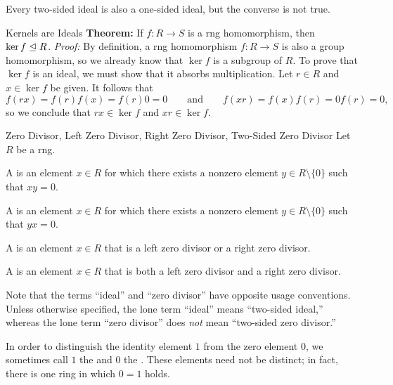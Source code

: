 
Every two-sided ideal is also a one-sided ideal, but the converse is not true.

\begin{thmbox}{Kernels are Ideals}
	\textbf{Theorem:} If $f: R \to S$ is a rng homomorphism, then $\ker f \trianglelefteq R$.
\tcblower
	\textit{Proof:} By definition, a rng homomorphism $f: R \to S$ is also a group homomorphism, so we already know that $\ker f$ is a subgroup of $R$. To prove that $\ker f$ is an ideal, we must show that it absorbs multiplication. Let $r \in R$ and $x \in \ker f$ be given. It follows that
	\[ f(rx) = f(r)f(x) = f(r)0 = 0
	\qquad \text{and} \qquad
	f(xr) = f(x)f(r) = 0f(r) = 0, \]
	so we conclude that $rx \in \ker f$ and $xr \in \ker f$.
\end{thmbox}

\begin{dfnbox}{Zero Divisor, Left Zero Divisor, Right Zero Divisor, Two-Sided Zero Divisor}
	Let $R$ be a rng.
	\begin{dfnitems}
		\item A  is an element $x \in R$ for which there exists a nonzero element $y \in R \setminus \{0\}$ such that $xy = 0$.
		\item A  is an element $x \in R$ for which there exists a nonzero element $y \in R \setminus \{0\}$ such that $yx = 0$.
		\item A  is an element $x \in R$ that is a left zero divisor or a right zero divisor.
		\item A  is an element $x \in R$ that is both a left zero divisor and a right zero divisor.
	\end{dfnitems}
\end{dfnbox}

Note that the terms ``ideal'' and ``zero divisor'' have opposite usage conventions. Unless otherwise specified, the lone term ``ideal'' means ``two-sided ideal,'' whereas the lone term ``zero divisor'' does \textit{not} mean ``two-sided zero divisor.''

In order to distinguish the identity element $1$ from the zero element $0$, we sometimes call $1$ the  and $0$ the . These elements need not be distinct; in fact, there is one ring in which $0 = 1$ holds.

